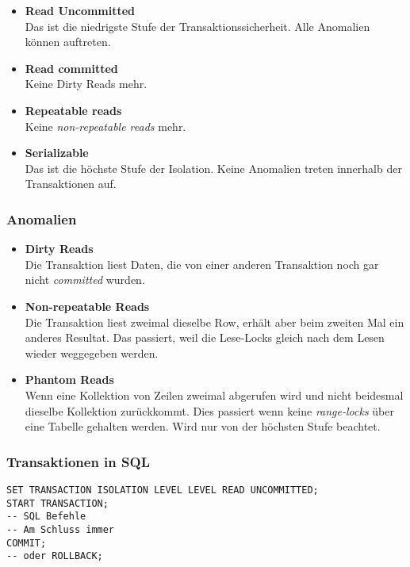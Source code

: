 \begin{itemize}
  \item \textbf{Read Uncommitted} \\
  Das ist die niedrigste Stufe der Transaktionssicherheit.  Alle Anomalien können auftreten.
  \item \textbf{Read committed} \\
  Keine Dirty Reads mehr. 
  \item \textbf{Repeatable reads} \\
  Keine \emph{non-repeatable reads} mehr. 
  \item \textbf{Serializable} \\
  Das ist die höchste Stufe der Isolation. Keine Anomalien treten innerhalb der Transaktionen auf.
\end{itemize}

\subsubsection{Anomalien}

\begin{itemize}
  \item \textbf{Dirty Reads} \\
  Die Transaktion liest Daten, die von einer anderen Transaktion noch gar nicht \emph{committed} wurden.
  \item \textbf{Non-repeatable Reads} \\
  Die Transaktion liest zweimal dieselbe Row, erhält aber beim zweiten Mal ein anderes Resultat. Das passiert, weil die Lese-Locks gleich nach dem Lesen wieder weggegeben werden.
  \item \textbf{Phantom Reads} \\
  Wenn eine Kollektion von Zeilen zweimal abgerufen wird und nicht beidesmal dieselbe Kollektion zurückkommt. Dies passiert wenn keine \emph{range-locks} über eine Tabelle gehalten werden. Wird nur von der höchsten Stufe beachtet.
  
\end{itemize}

\subsubsection{Transaktionen in SQL}
\begin{lstlisting}[caption={Transaktionen in SQL}]
SET TRANSACTION ISOLATION LEVEL LEVEL READ UNCOMMITTED;
START TRANSACTION;
-- SQL Befehle
-- Am Schluss immer
COMMIT;
-- oder ROLLBACK;
\end{lstlisting}
